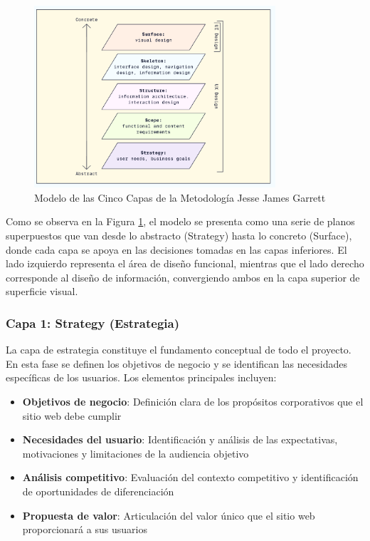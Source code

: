 \begin{figure}[htbp]
    \centering
    \includegraphics[width=0.8\textwidth]{Figures/ux.png}
    \caption{Modelo de las Cinco Capas de la Metodología Jesse James Garrett}
    \label{fig:ux-methodology}
\end{figure}

Como se observa en la Figura \ref{fig:ux-methodology}, el modelo se presenta como una serie de planos superpuestos que van desde lo abstracto (Strategy) hasta lo concreto (Surface), donde cada capa se apoya en las decisiones tomadas en las capas inferiores. El lado izquierdo representa el área de diseño funcional, mientras que el lado derecho corresponde al diseño de información, convergiendo ambos en la capa superior de superficie visual.

\subsubsection{Capa 1: Strategy (Estrategia)}

La capa de estrategia constituye el fundamento conceptual de todo el proyecto. En esta fase se definen los objetivos de negocio y se identifican las necesidades específicas de los usuarios. Los elementos principales incluyen:

\begin{itemize}
    \item \textbf{Objetivos de negocio}: Definición clara de los propósitos corporativos que el sitio web debe cumplir
    \item \textbf{Necesidades del usuario}: Identificación y análisis de las expectativas, motivaciones y limitaciones de la audiencia objetivo
    \item \textbf{Análisis competitivo}: Evaluación del contexto competitivo y identificación de oportunidades de diferenciación
    \item \textbf{Propuesta de valor}: Articulación del valor único que el sitio web proporcionará a sus usuarios
\end{itemize}

